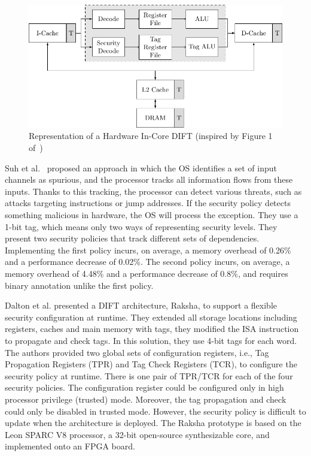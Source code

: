 \begin{figure}[ht]
    \centering
    \includegraphics{c2_soa/img/incore.pdf}
    \caption{Representation of a Hardware In-Core DIFT (inspired by Figure 1 of~\cite{KDK-09-dsn})}
    \label{fig:incore_dift}
\end{figure}

Suh et al.~\cite{SLD-04-sigplan} proposed an approach in which the OS identifies a set of input channels as spurious, and the processor tracks all information flows from these inputs. Thanks to this tracking, the processor can detect various threats, such as attacks targeting instructions or jump addresses. If the security policy detects something malicious in hardware, the OS will process the exception. They use a 1-bit tag, which means only two ways of representing security levels. They present two security policies that track different sets of dependencies. Implementing the first policy incurs, on average, a memory overhead of 0.26\% and a performance decrease of 0.02\%. The second policy incurs, on average, a memory overhead of 4.48\% and a performance decrease of 0.8\%, and requires binary annotation unlike the first policy.

Dalton et al.\cite{DKK-07-sigarch} presented a DIFT architecture, Raksha, to support a flexible security configuration at runtime. They extended all storage locations including registers, caches and main memory with tags, they modified the ISA instruction to propagate and check tags. In this solution, they use 4-bit tags for each word.
The authors provided two global sets of configuration registers, i.e., Tag Propagation Registers (TPR) and Tag Check Registers (TCR), to configure the security policy at runtime. There is one pair of TPR/TCR for each of the four security policies. The configuration register could be configured only in high processor privilege (trusted) mode. Moreover, the tag propagation and check could only be disabled in trusted mode. However, the security policy is difficult to update when the architecture is deployed.
The Raksha prototype is based on the Leon SPARC V8 processor, a 32-bit open-source synthesizable core, and implemented onto an FPGA board.

